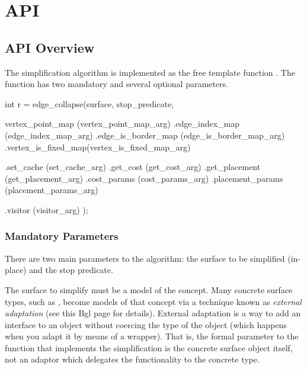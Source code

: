 \section{API}

\subsection{API Overview}

The simplification algorithm is implemented as the free template function 
. The function has two mandatory and several optional parameters.

\begin{cprog}
int r = edge_collapse(surface,
                     stop_predicate,
                     
                     vertex_point_map   (vertex_point_map_arg)
                     .edge_index_map     (edge_index_map_arg)
                     .edge_is_border_map (edge_is_border_map_arg)
                     .vertex_is_fixed_map(vertex_is_fixed_map_arg)
                     
                     .set_cache          (set_cache_arg)
                     .get_cost           (get_cost_arg)
                     .get_placement      (get_placement_arg)
                     .cost_params        (cost_params_arg)
                     .placement_params   (placement_params_arg)
                     
                     .visitor            (visitor_arg)
                     );
\end{cprog}

\subsubsection{Mandatory Parameters}

There are two main parameters to the algorithm: the surface to be simplified (in-place) and the stop predicate.

The surface to simplify must be a model of the  concept. 
Many concrete surface types, such as , become models of 
that concept via a technique known as 
{\em external adaptation} 
(see 
{this {\sc Bgl} page for details}). External adaptation is a way to add an interface to an 
object without coercing the type of the object (which happens when you adapt it by means 
of a wrapper). That is, the formal parameter to the  function that 
implements the simplification is the concrete surface object itself, not an adaptor 
which delegates the functionality to the concrete type.

